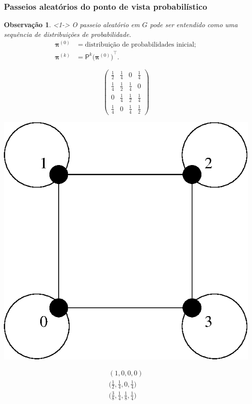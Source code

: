 \documentclass{beamer}
\def\MMp{\mathrm{.}} %
\def\MMpv{\mathrm{;}} %
\def\vetor#1{\boldsymbol{#1}}
\def\matriz#1{\mathsf{#1}}
\def\transp#1{{#1}^{\scriptscriptstyle \top}}
\theoremstyle{teoaxicorlem}
\theoremstyle{defnotnom}
\newtheorem{Obs}{Observação}
\begin{document}
\begin{frame}
  \frametitle{Passeios aleatórios do ponto de vista probabilístico}
  \begin{Obs}<1->
    O passeio aleatório em $G$
    pode ser entendido como uma sequência
    de distribuições de probabilidade.
    \begin{equation*}
      \begin{aligned}
        {\vetor \pi}^{(0)} &=
        \text{distribuição de probabilidades
          inicial}\MMpv\\
        {\vetor \pi}^{(k)} &= {\matriz P}^k
        \transp{\bigl({{\vetor \pi}^{(0)}}\bigr)}\MMp
      \end{aligned}
    \end{equation*}
  \end{Obs}
  \vfill\pause
  \parbox{.3\linewidth}{
    \begin{equation*}
      \begin{pmatrix}
        \textstyle\frac12 & \textstyle\frac14 & 0 & \textstyle\frac14
        \\
        \textstyle\frac14 & \textstyle\frac12 & \textstyle\frac14 & 0
        \\
        0 & \textstyle\frac14 & \textstyle\frac12 & \textstyle\frac14
        \\
        \textstyle\frac14 & 0 & \textstyle\frac14 & \textstyle\frac12
    \end{pmatrix}
    \end{equation*}
  }\hfill
  \parbox{.3\linewidth}{
    \centering
    \includegraphics[width=.25\textwidth]{d2.eps}
  }\hfill
  \parbox{.3\linewidth}{
    \begin{equation*}
      \begin{gathered}
        (1,0,0,0) \\
        \bigl(\textstyle\frac12, \textstyle\frac14, 0,
        \textstyle\frac14\bigr)
        \\
        \bigl(\textstyle\frac38, \textstyle\frac14, \textstyle\frac18,
        \textstyle\frac14\bigr)
      \end{gathered}
    \end{equation*}
  }
\end{frame}
\end{document}
